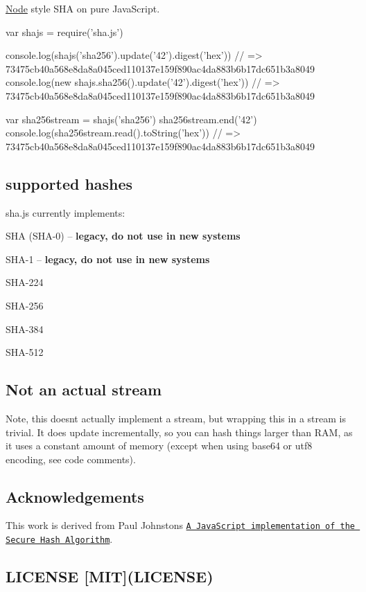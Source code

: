 \href{https://www.npmjs.org/package/sha.js}{\tt } \href{https://travis-ci.org/crypto-browserify/sha.js}{\tt } \href{https://david-dm.org/crypto-browserify/sha.js#info=dependencies}{\tt }

\href{https://github.com/feross/standard}{\tt }

\mbox{\hyperlink{classNode}{Node}} style {\ttfamily S\+HA} on pure Java\+Script.


\begin{DoxyCode}
var shajs = require('sha.js')

console.log(shajs('sha256').update('42').digest('hex'))
// => 73475cb40a568e8da8a045ced110137e159f890ac4da883b6b17dc651b3a8049
console.log(new shajs.sha256().update('42').digest('hex'))
// => 73475cb40a568e8da8a045ced110137e159f890ac4da883b6b17dc651b3a8049

var sha256stream = shajs('sha256')
sha256stream.end('42')
console.log(sha256stream.read().toString('hex'))
// => 73475cb40a568e8da8a045ced110137e159f890ac4da883b6b17dc651b3a8049
\end{DoxyCode}


\subsection*{supported hashes}

{\ttfamily sha.\+js} currently implements\+:


\begin{DoxyItemize}
\item S\+HA (S\+H\+A-\/0) -- {\bfseries legacy, do not use in new systems}
\item S\+H\+A-\/1 -- {\bfseries legacy, do not use in new systems}
\item S\+H\+A-\/224
\item S\+H\+A-\/256
\item S\+H\+A-\/384
\item S\+H\+A-\/512
\end{DoxyItemize}

\subsection*{Not an actual stream}

Note, this doesn\textquotesingle{}t actually implement a stream, but wrapping this in a stream is trivial. It does update incrementally, so you can hash things larger than R\+AM, as it uses a constant amount of memory (except when using base64 or utf8 encoding, see code comments).

\subsection*{Acknowledgements}

This work is derived from Paul Johnston\textquotesingle{}s \href{http://pajhome.org.uk/crypt/md5/sha1.html}{\tt A Java\+Script implementation of the Secure Hash Algorithm}.

\subsection*{L\+I\+C\+E\+N\+SE \mbox{[}M\+IT\mbox{]}(L\+I\+C\+E\+N\+SE)}